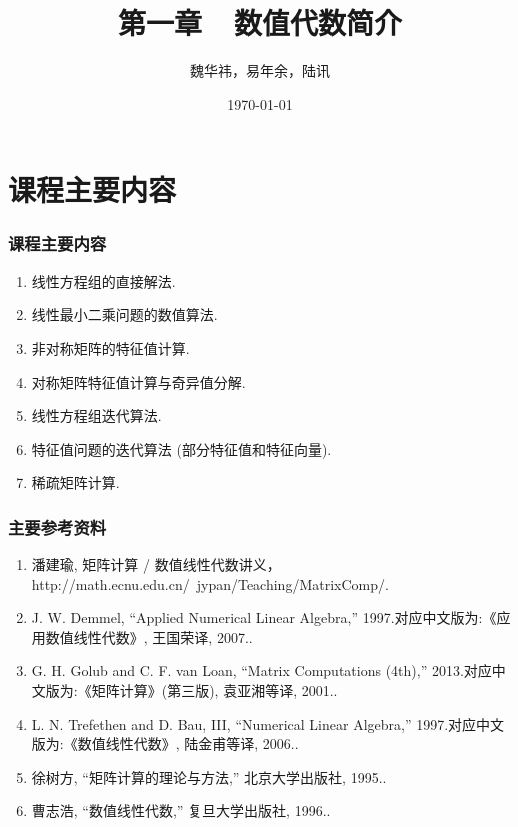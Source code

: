 \documentclass[notheorems,serif]{beamer}
\begin{document}
\title{第一章~~数值代数简介}

\author[]{魏华祎，易年余，陆讯}


\date{\today}



\frame[plain]{\titlepage}


\section{课程主要内容}

\begin{frame}
\frametitle{课程主要内容}
\begin{enumerate}
	\item 线性方程组的直接解法.
	\item 线性最小二乘问题的数值算法.
	\item 非对称矩阵的特征值计算.
	\item 对称矩阵特征值计算与奇异值分解.
	\item 线性方程组迭代算法.
	\item 特征值问题的迭代算法 (部分特征值和特征向量). 
	\item 稀疏矩阵计算.  
\end{enumerate}
\end{frame}

\begin{frame}
\frametitle{主要参考资料}
\begin{enumerate}
    \item { 潘建瑜, 矩阵计算 / 数值线性代数讲义， http://math.ecnu.edu.cn/~jypan/Teaching/MatrixComp/.}
	\item { J. W. Demmel, “Applied Numerical Linear Algebra,” 1997.对应中文版为:《应用数值线性代数》, 王国荣译, 2007.}.
	\item { G. H. Golub and C. F. van Loan, “Matrix Computations (4th),” 2013.对应中文版为:《矩阵计算》(第三版), 袁亚湘等译, 2001.}.
	\item { L. N. Trefethen and D. Bau, III, “Numerical Linear Algebra,” 1997.对应中文版为:《数值线性代数》, 陆金甫等译, 2006.}.
	\item { 徐树方, “矩阵计算的理论与方法,” 北京大学出版社, 1995.}.
	\item { 曹志浩, “数值线性代数,” 复旦大学出版社, 1996.}. 
\end{enumerate}
\end{frame}
\end{document}
